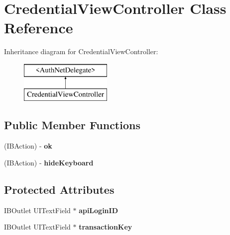\hypertarget{interface_credential_view_controller}{
\section{CredentialViewController Class Reference}
\label{interface_credential_view_controller}
}
Inheritance diagram for CredentialViewController:\begin{figure}[H]
\begin{center}
\leavevmode
\includegraphics[height=2.000000cm]{interface_credential_view_controller}
\end{center}
\end{figure}
\subsection*{Public Member Functions}
\begin{DoxyCompactItemize}
\item 
\hypertarget{interface_credential_view_controller_af4d6cb6b4e5ab9a23cfa7bfaf177d3a1}{
(IBAction) -\/ {\bfseries ok}}
\label{interface_credential_view_controller_af4d6cb6b4e5ab9a23cfa7bfaf177d3a1}

\item 
\hypertarget{interface_credential_view_controller_a67567e420fae29030889e6e8482b5ad3}{
(IBAction) -\/ {\bfseries hideKeyboard}}
\label{interface_credential_view_controller_a67567e420fae29030889e6e8482b5ad3}

\end{DoxyCompactItemize}
\subsection*{Protected Attributes}
\begin{DoxyCompactItemize}
\item 
\hypertarget{interface_credential_view_controller_aac23f5d6f48286f25df34f2043dfcb02}{
IBOutlet UITextField $\ast$ {\bfseries apiLoginID}}
\label{interface_credential_view_controller_aac23f5d6f48286f25df34f2043dfcb02}

\item 
\hypertarget{interface_credential_view_controller_af241a0b328f6ab7b1874f15ba0e2f05a}{
IBOutlet UITextField $\ast$ {\bfseries transactionKey}}
\label{interface_credential_view_controller_af241a0b328f6ab7b1874f15ba0e2f05a}

\end{DoxyCompactItemize}

